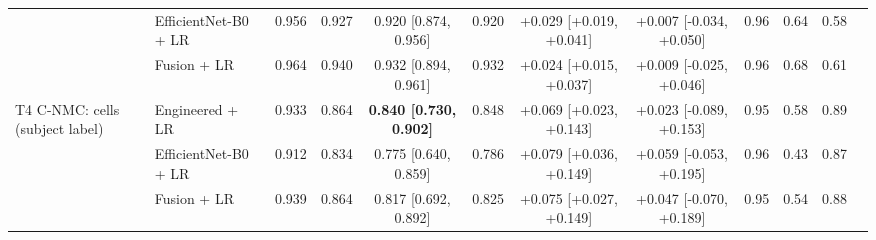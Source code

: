 \begin{table}[!t]
{\begin{tabular}{llcccccccccc}
 & EfficientNet-B0 + LR & 0.956 & 0.927 & 0.920 [0.874, 0.956] & 0.920 & +0.029 [+0.019, +0.041] & +0.007 [-0.034, +0.050] & 0.96 & 0.64 & 0.58 \\
 & Fusion + LR & 0.964 & 0.940 & 0.932 [0.894, 0.961] & 0.932 & +0.024 [+0.015, +0.037] & +0.009 [-0.025, +0.046] & 0.96 & 0.68 & 0.61 \\
\midrule
T4 C-NMC: cells (subject label) & Engineered + LR & 0.933 & 0.864 & \textbf{0.840 [0.730, 0.902]} & 0.848 & +0.069 [+0.023, +0.143] & +0.023 [-0.089, +0.153] & 0.95 & 0.58 & 0.89 \\
 & EfficientNet-B0 + LR & 0.912 & 0.834 & 0.775 [0.640, 0.859] & 0.786 & +0.079 [+0.036, +0.149] & +0.059 [-0.053, +0.195] & 0.96 & 0.43 & 0.87 \\
 & Fusion + LR & 0.939 & 0.864 & 0.817 [0.692, 0.892] & 0.825 & +0.075 [+0.027, +0.149] & +0.047 [-0.070, +0.189] & 0.95 & 0.54 & 0.88 \\
\bottomrule
\end{tabular}}
\end{table}